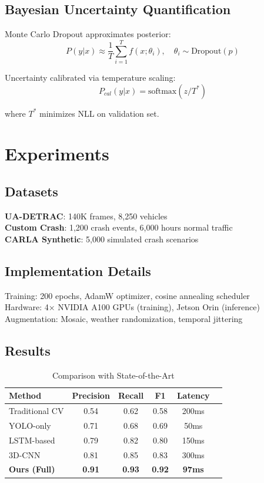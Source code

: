 \documentclass[conference]{IEEEtran}
\begin{document}
\subsection{Bayesian Uncertainty Quantification}

Monte Carlo Dropout approximates posterior:
\begin{equation}
P(y|x) \approx \frac{1}{T}\sum_{i=1}^T f(x; \theta_i), \quad \theta_i \sim \text{Dropout}(p)
\end{equation}

Uncertainty calibrated via temperature scaling:
\begin{equation}
P_{cal}(y|x) = \text{softmax}(z/T^*)
\end{equation}

where $T^*$ minimizes NLL on validation set.

\section{Experiments}

\subsection{Datasets}

\textbf{UA-DETRAC}: 140K frames, 8,250 vehicles\\
\textbf{Custom Crash}: 1,200 crash events, 6,000 hours normal traffic\\
\textbf{CARLA Synthetic}: 5,000 simulated crash scenarios

\subsection{Implementation Details}

Training: 200 epochs, AdamW optimizer, cosine annealing scheduler\\
Hardware: 4× NVIDIA A100 GPUs (training), Jetson Orin (inference)\\
Augmentation: Mosaic, weather randomization, temporal jittering

\subsection{Results}

\begin{table}[h]
\centering
\caption{Comparison with State-of-the-Art}
\begin{tabular}{lccccc}
\hline
Method & Precision & Recall & F1 & Latency \\
\hline
Traditional CV & 0.54 & 0.62 & 0.58 & 200ms \\
YOLO-only & 0.71 & 0.68 & 0.69 & 50ms \\
LSTM-based & 0.79 & 0.82 & 0.80 & 150ms \\
3D-CNN & 0.81 & 0.85 & 0.83 & 300ms \\
\textbf{Ours (Full)} & \textbf{0.91} & \textbf{0.93} & \textbf{0.92} & \textbf{97ms} \\
\hline
\end{tabular}
\end{table}
\end{document}
